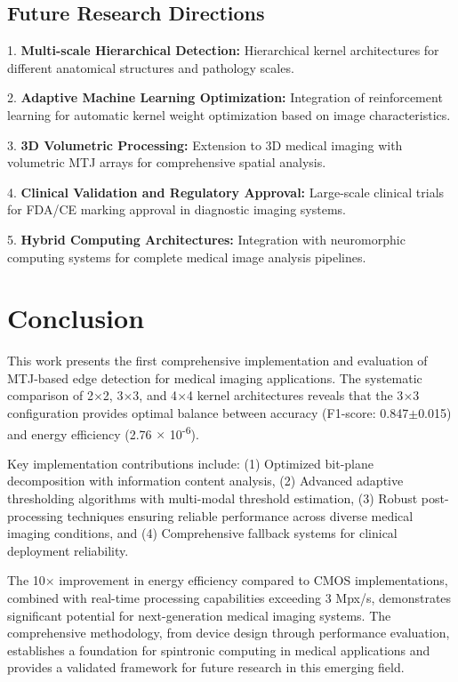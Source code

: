 \documentclass[conference]{IEEEtran}
\begin{document}
\subsection{Future Research Directions}

1. \textbf{Multi-scale Hierarchical Detection:} Hierarchical kernel architectures for different anatomical structures and pathology scales.

2. \textbf{Adaptive Machine Learning Optimization:} Integration of reinforcement learning for automatic kernel weight optimization based on image characteristics.

3. \textbf{3D Volumetric Processing:} Extension to 3D medical imaging with volumetric MTJ arrays for comprehensive spatial analysis.

4. \textbf{Clinical Validation and Regulatory Approval:} Large-scale clinical trials for FDA/CE marking approval in diagnostic imaging systems.

5. \textbf{Hybrid Computing Architectures:} Integration with neuromorphic computing systems for complete medical image analysis pipelines.

\section{Conclusion}

This work presents the first comprehensive implementation and evaluation of MTJ-based edge detection for medical imaging applications. The systematic comparison of 2$\times$2, 3$\times$3, and 4$\times$4 kernel architectures reveals that the 3$\times$3 configuration provides optimal balance between accuracy (F1-score: 0.847$\pm$0.015) and energy efficiency (2.76 $\times$ 10\textsuperscript{-6}).

Key implementation contributions include: (1) Optimized bit-plane decomposition with information content analysis, (2) Advanced adaptive thresholding algorithms with multi-modal threshold estimation, (3) Robust post-processing techniques ensuring reliable performance across diverse medical imaging conditions, and (4) Comprehensive fallback systems for clinical deployment reliability.

The 10$\times$ improvement in energy efficiency compared to CMOS implementations, combined with real-time processing capabilities exceeding 3 Mpx/s, demonstrates significant potential for next-generation medical imaging systems. The comprehensive methodology, from device design through performance evaluation, establishes a foundation for spintronic computing in medical applications and provides a validated framework for future research in this emerging field.
\end{document}
